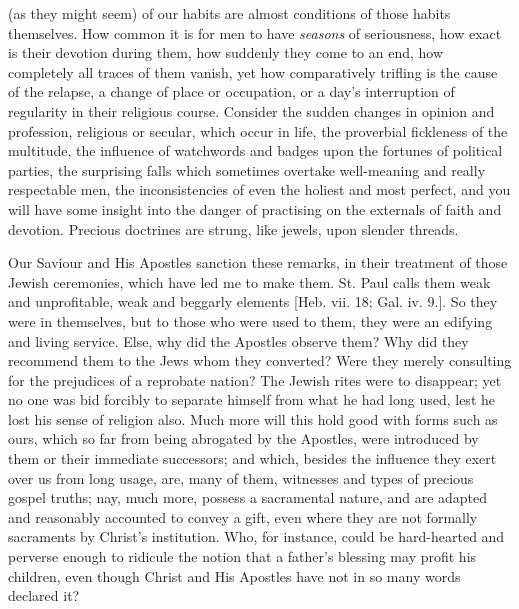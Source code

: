 (as they might seem) of our habits are almost conditions of those
habits themselves. How common it is for men to have \emph{seasons} of
seriousness, how exact is their devotion during them, how suddenly
they come to an end, how completely all traces of them vanish, yet how
comparatively trifling is the cause of the relapse, a change of place
or occupation, or a day's interruption of regularity in their
religious course. Consider the sudden changes in opinion and
profession, religious or secular, which occur in life, the proverbial
fickleness of the multitude, the influence of watchwords and badges
upon the fortunes of political parties, the surprising falls which
sometimes overtake well-meaning and really respectable men, the
inconsistencies of even the holiest and most perfect, and you will
have some insight into the danger of practising on the externals of
faith and devotion. Precious doctrines are strung, like jewels, upon
slender threads.

Our Saviour and His Apostles sanction these remarks, in their
treatment of those Jewish ceremonies, which have led me to make them.
St. Paul calls them weak and unprofitable, weak and beggarly elements
[Heb. vii. 18; Gal. iv. 9.]. So they were in themselves, but to those
who were used to them, they were an edifying and living service. Else,
why did the Apostles observe them? Why did they recommend them to the
Jews whom they converted? Were they merely consulting for the
prejudices of a reprobate nation? The Jewish rites were to disappear;
yet no one was bid forcibly to separate himself from what he had long
used, lest he lost his sense of religion also. Much more will this
hold good with forms such as ours, which so far from being abrogated
by the Apostles, were introduced by them or their immediate
successors; and which, besides the influence they exert over us from
long usage, are, many of them, witnesses and types of precious gospel
truths; nay, much more, possess a sacramental nature, and are adapted
and reasonably accounted to convey a gift, even where they are not
formally sacraments by Christ's institution. Who, for instance, could
be hard-hearted and perverse enough to ridicule the notion that a
father's blessing may profit his children, even though Christ and His
Apostles have not in so many words declared it?


